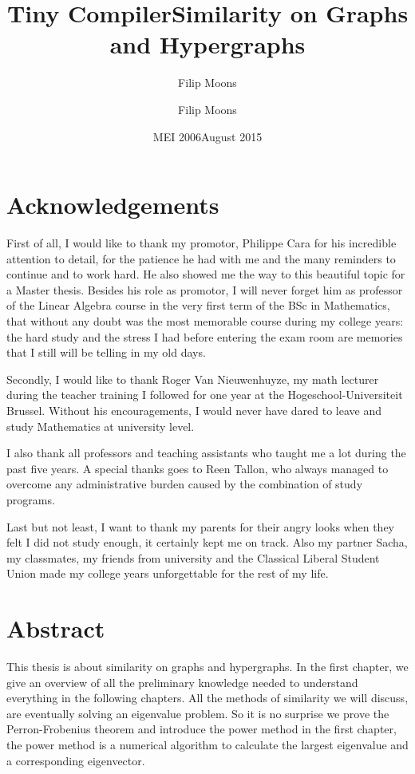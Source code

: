 \documentclass[a4paper,11pt]{report}
\author{Filip Moons}
\title{Tiny Compiler}
\author{Filip Moons}
\title{Similarity on Graphs and Hypergraphs}
\date{MEI 2006}
\date{August 2015}
\begin{document}
\maketitlepage
\chapter*{Acknowledgements}
First of all, I would like to thank my promotor, Philippe Cara for his incredible attention to detail, 
for the patience he had with me and the many reminders to continue and to work 
hard. He also showed me the way to this beautiful topic for a Master thesis. Besides his role as 
promotor, I will never forget him as professor of the Linear Algebra course in 
the very first term of the BSc in Mathematics, that without any doubt was the 
most memorable course during my college years: the hard study and the stress I 
had before entering the exam room are memories that I still will be telling in my 
old days.

Secondly, I would like to thank Roger Van Nieuwenhuyze, my math lecturer during 
the teacher training I followed for one year at the Hogeschool-Universiteit Brussel. Without his encouragements, I would never have dared to leave
and study Mathematics at university level. 

I also thank all professors and teaching assistants who taught me a 
lot during the past five years. A special thanks goes to Reen Tallon, who 
always managed to overcome any administrative burden caused by the combination 
of study programs.

Last but not least, I want to thank my parents for their angry looks when they 
felt I did not study enough, it certainly kept me on track. Also my partner Sacha, my classmates, my friends from university and the Classical Liberal Student  
Union made my college years unforgettable for the rest of my life.


 
\chapter*{Abstract}
This thesis is about similarity on graphs and hypergraphs. In the first chapter, 
we give an overview of all the preliminary knowledge needed to understand 
everything in the following chapters. All the methods of similarity we will 
discuss, are eventually solving an eigenvalue problem. So it is no surprise we 
prove the Perron-Frobenius theorem and introduce the power method in the first 
chapter, the power method is a numerical algorithm to calculate the largest 
eigenvalue and a corresponding eigenvector.
\end{document}

